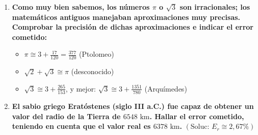 \documentclass[10pt, a4paper]{article}
\begin{document}
\begin{enumerate}
    \textit{¿Algún día se podrá encontrar una fracción de enteros exactamente igual a $\pi$?}

    \item \textbf{Como muy bien sabemos, los números $\pi$ o $\sqrt{3}$ son irracionales; los matemáticos antiguos manejaban aproximaciones muy precisas. Comprobar la precisión de dichas aproximaciones e indicar el error cometido:}
    \begin{itemize}
        \item $\pi \cong 3 + \frac{17}{120} = \frac{377}{120}$ (Ptolomeo)
        \item $\sqrt{2} + \sqrt{3} \cong \pi$ (desconocido)
        \item $\sqrt{3} \cong 3 + \frac{265}{153}$, y mejor: $\sqrt{3} \cong 3 + \frac{1351}{780}$ (Arquímedes)
    \end{itemize}

    \item \textbf{El sabio griego Eratóstenes (siglo III a.C.) fue capaz de obtener un valor del radio de la Tierra de $6548\text{ km}$. Hallar el error cometido, teniendo en cuenta que el valor real es $6378\text{ km}$.} \hfill $(\text{Soluc: } E_r \cong 2{,}67\%)$
\end{enumerate}
\end{document}
